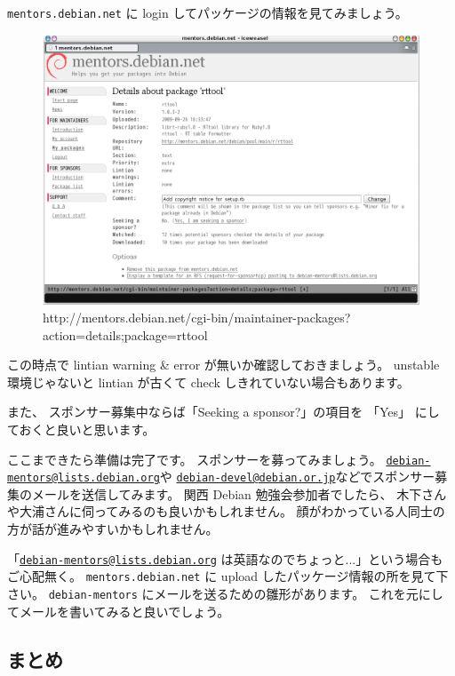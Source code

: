 \documentclass[mingoth,a4paper]{jsarticle}
\begin{document}
{\tt mentors.debian.net} に login してパッケージの情報を見てみましょう。
\begin{figure}[h]
    \begin{center}
        \includegraphics[scale=0.6]{image200909/mentors-package.png}
        \caption[mentors-package]{%
          http://mentors.debian.net/cgi-bin/maintainer-packages?action=details;package=rttool}
    \end{center}
\end{figure}

この時点で lintian warning \& error が無いか確認しておきましょう。
unstable 環境じゃないと lintian が古くて check しきれていない場合もあります。

また、 スポンサー募集中ならば「Seeking a sponsor?」の項目を 「Yes」 にし
ておくと良いと思います。

ここまできたら準備は完了です。 スポンサーを募ってみましょう。
\href{mailto:debian-mentors@lists.debian.org}{{\tt debian-mentors@lists.debian.org}}や \href{mailto:debian-devel@debian.or.jp}{{\tt debian-devel@debian.or.jp}}などでスポンサー募集のメールを送信してみます。
関西 Debian 勉強会参加者でしたら、 木下さんや大浦さんに伺ってみるのも良いかもしれません。 顔がわかっている人同士の方が話が進みやすいかもしれません。


「\href{mailto:debian-mentors@lists.debian.org}{{\tt debian-mentors@lists.debian.org}} は英語なのでちょっと...」という場合もご心配無く。 {\tt mentors.debian.net} に upload したパッケージ情報の所を見て下さい。 {\tt debian-mentors} にメールを送るための雛形があります。 これを元にしてメールを書いてみると良いでしょう。

\subsection{まとめ}
\end{document}
